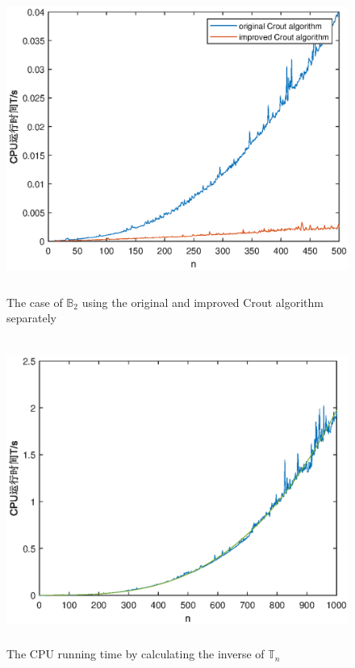 \documentclass[UTF8,a4paper,10pt]{ctexart}
\begin{document}
\begin{figure}[ht]
    \centering
    \includegraphics[width=14cm,height=10cm]{1.2_B2_comparison.eps}
    \caption{The case of $\mathbb{B}_2$ using the original and improved Crout algorithm separately}
    \end{figure}
\begin{figure}[ht]
    \centering
    \includegraphics[width=14cm,height=10cm]{1.3_cpu_time.eps}
    \caption{The CPU running time by calculating the inverse of $\mathbb{T}_n$}
\end{figure}
\end{document}
